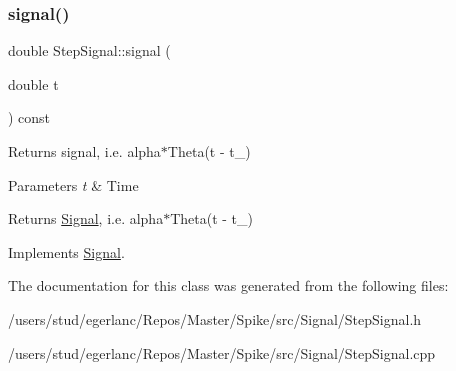 \subsubsection{\texorpdfstring{signal()}{signal()}}
{\footnotesize\ttfamily double Step\+Signal\+::signal (\begin{DoxyParamCaption}\item[{double}]{t }\end{DoxyParamCaption}) const\hspace{0.3cm}{\ttfamily [virtual]}}



Returns signal, i.\+e. alpha$\ast$\+Theta(t -\/ t\+\_) 


\begin{DoxyParams}{Parameters}
{\em t} & Time \\
\hline
\end{DoxyParams}
\begin{DoxyReturn}{Returns}
\hyperlink{classSignal}{Signal}, i.\+e. alpha$\ast$\+Theta(t -\/ t\+\_) 
\end{DoxyReturn}


Implements \hyperlink{classSignal_a32c22f17b70b215d78171716f844fa60}{Signal}.



The documentation for this class was generated from the following files\+:\begin{DoxyCompactItemize}
\item 
/users/stud/egerlanc/\+Repos/\+Master/\+Spike/src/\+Signal/Step\+Signal.\+h\item 
/users/stud/egerlanc/\+Repos/\+Master/\+Spike/src/\+Signal/Step\+Signal.\+cpp\end{DoxyCompactItemize}
